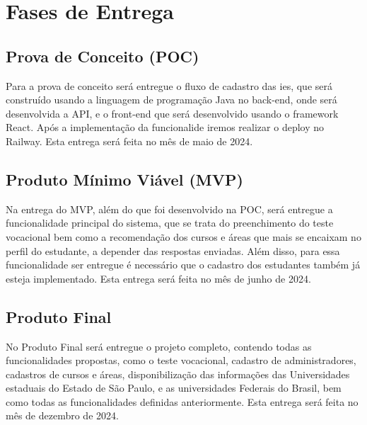 \section{Fases de Entrega}

\subsection{ Prova de Conceito (POC)}

Para a prova de conceito será entregue o fluxo de cadastro das \ac{ies}, que será construído usando a linguagem de programação Java no back-end, onde será desenvolvida a API, e o front-end que será desenvolvido usando o framework React. Após a implementação da funcionalide iremos realizar o deploy no Railway. Esta entrega será feita no mês de maio de 2024.

\subsection{Produto Mínimo Viável (MVP)}

Na entrega do MVP, além do que foi desenvolvido na POC, será entregue a funcionalidade principal do sistema, que se trata do preenchimento do teste vocacional  bem como a recomendação dos cursos e áreas que mais se encaixam no perfil do estudante, a depender das respostas enviadas. Além disso, para essa funcionalidade ser entregue é necessário que o cadastro dos estudantes também já esteja implementado. Esta entrega será feita no mês de junho de 2024.


\subsection{Produto Final}

No Produto Final será entregue o projeto completo, contendo todas as funcionalidades propostas, como o teste vocacional, cadastro de administradores, cadastros de cursos e áreas, disponibilização das informações das Universidades estaduais do Estado de São Paulo, e as universidades Federais do Brasil, bem como todas as funcionalidades
definidas anteriormente. Esta entrega será feita no mês de dezembro de 2024.